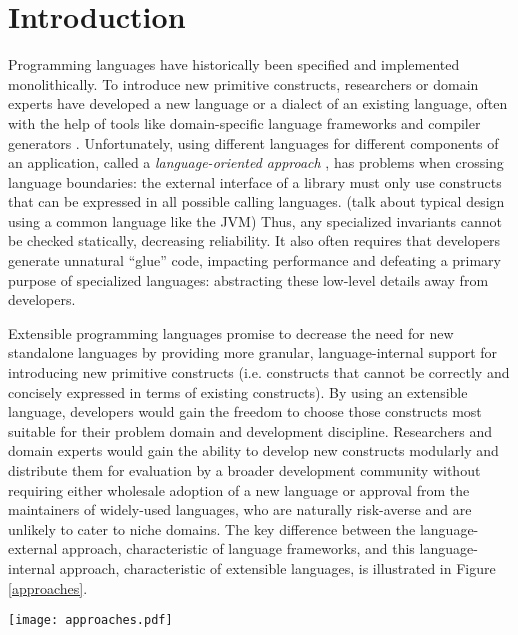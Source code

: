 \documentclass[10pt]{sigplanconf}
\newcommand{\TODO}[1]{{\color{red} #1}}
\begin{document}
\section{Introduction}
Programming languages have historically been specified and implemented monolithically. To introduce new primitive constructs, researchers or domain experts have developed a new language or a dialect of an existing language, often with the help of tools like domain-specific language frameworks and compiler generators \cite{fowler2010domain}. 
Unfortunately, using different languages for different components of an application, called a {\it language-oriented approach} \cite{journals/stp/Ward94}, has problems when crossing language boundaries: the external interface of a library must only use constructs that can be expressed in all possible calling languages. \TODO{(talk about typical design using a common language like the JVM)} Thus, any specialized invariants cannot be checked statically, decreasing reliability. It also often requires that developers generate unnatural ``glue'' code, impacting performance and defeating a primary purpose of specialized languages: abstracting these low-level details away from developers.

Extensible programming languages promise to decrease the need for new standalone languages by providing more granular, language-internal support for introducing new primitive constructs (i.e. constructs that cannot be correctly and concisely expressed in terms of existing constructs). By using an extensible language, developers would gain the freedom to choose those constructs most suitable for their problem domain and development discipline. Researchers and domain experts would gain the ability to develop new constructs modularly and distribute them for evaluation by a broader development community without requiring either wholesale adoption of a new language or approval from the maintainers of widely-used languages, who are naturally risk-averse and are unlikely to cater to niche domains. The key difference between the language-external approach, characteristic of language frameworks,  and this language-internal approach, characteristic of extensible languages, is illustrated in Figure \ref{approaches}.
\begin{figure*}
\begin{center}
\texttt{[image: approaches.pdf]}
\end{center}
\vspace{-20px}
\caption{\small (a) With the language-oriented approach, novel constructs are packaged into separate languages. Users can only safely and naturally call into languages consisting of common constructs. (b) With the library-oriented approach, there is one language and novel constructs are packaged as normal libraries. Thus, interoperability is not a problem. in monolithic systems, this approach is less expressive.\label{approaches}}
\end{figure*}
\end{document}
